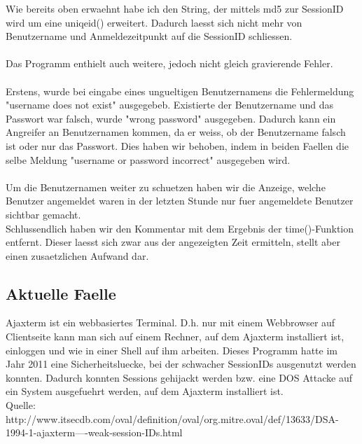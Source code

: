 Wie bereits oben erwaehnt habe ich den String, der mittels md5 zur SessionID wird um eine uniqeid() erweitert. Dadurch laesst sich nicht mehr von Benutzername und Anmeldezeitpunkt auf die SessionID schliessen.\\\\
Das Programm enthielt auch weitere, jedoch nicht gleich gravierende Fehler.\\\\
Erstens, wurde bei eingabe eines ungueltigen Benutzernamens die Fehlermeldung "username does not exist" ausgegebeb. Existierte der Benutzername und das Passwort war falsch, wurde "wrong password" ausgegeben. Dadurch kann ein Angreifer an Benutzernamen kommen, da er weiss, ob der Benutzername falsch ist oder nur das Passwort. Dies haben wir behoben, indem in beiden Faellen die selbe Meldung "username or password incorrect" ausgegeben wird.\\\\
Um die Benutzernamen weiter zu schuetzen haben wir die Anzeige, welche Benutzer angemeldet waren in der letzten Stunde nur fuer angemeldete Benutzer sichtbar gemacht.\\
Schlussendlich haben wir den Kommentar mit dem Ergebnis der time()-Funktion entfernt. Dieser laesst sich zwar aus der angezeigten Zeit ermitteln, stellt aber einen zusaetzlichen Aufwand dar.

\subsection{Aktuelle Faelle}

Ajaxterm ist ein webbasiertes Terminal. D.h. nur mit einem Webbrowser auf Clientseite kann man sich auf einem Rechner, auf dem Ajaxterm installiert ist, einloggen und wie in einer Shell auf ihm arbeiten. Dieses Programm hatte im Jahr 2011 eine Sicherheitsluecke, bei der schwacher SessionIDs ausgenutzt werden konnten. Dadurch konnten Sessions gehijackt werden bzw. eine DOS Attacke auf ein System ausgefuehrt werden, auf dem Ajaxterm installiert ist.\\
Quelle: http://www.itsecdb.com/oval/definition/oval/org.mitre.oval/def/13633/DSA-1994-1-ajaxterm----weak-session-IDs.html





